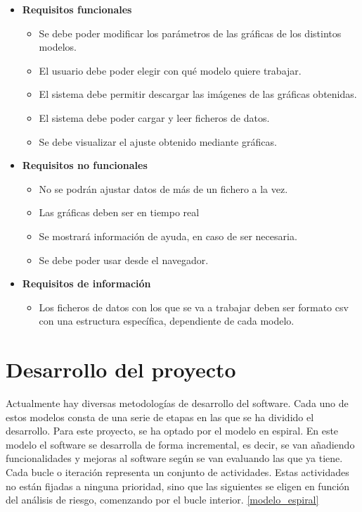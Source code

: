 \begin{itemize}
\item \textbf{Requisitos funcionales}
	\begin{itemize}
	\item Se debe poder modificar los parámetros de las gráficas de los distintos modelos.
	\item El usuario debe poder elegir con qué modelo quiere trabajar.
	\item El sistema debe permitir descargar las imágenes de las gráficas obtenidas.
	\item El sistema debe poder cargar y leer ficheros de datos.
	\item Se debe visualizar el ajuste obtenido mediante gráficas.
	\end{itemize}
\item \textbf{Requisitos no funcionales}
	\begin{itemize}
	\item No se podrán ajustar datos de más de un fichero a la vez.
	\item Las gráficas deben ser en tiempo real
	\item Se mostrará información de ayuda, en caso de ser necesaria.
	\item Se debe poder usar desde el navegador.
	\end{itemize}
\item \textbf{Requisitos de información}
	\begin{itemize}
	\item Los ficheros de datos con los que se va a trabajar deben ser formato csv con una estructura específica, dependiente de cada modelo.
	\end{itemize}
\end{itemize}

\section{Desarrollo del proyecto}

Actualmente hay diversas metodologías de desarrollo del software. Cada uno de estos modelos consta de una serie de etapas en las que se ha dividido el desarrollo. Para este proyecto, se ha optado por el modelo en espiral. En este modelo el software se desarrolla de forma incremental, es decir, se van añadiendo funcionalidades y mejoras al software según se van evaluando las que ya tiene. Cada bucle o iteración representa un conjunto de actividades. Estas actividades no están fijadas a ninguna prioridad, sino que las siguientes se eligen en función del análisis de riesgo, comenzando por el bucle interior. \eqref{modelo_espiral}

